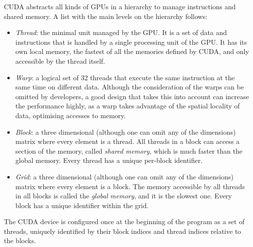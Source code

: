 \ac{CUDA} abstracts all kinds of \acp{GPU} in a hierarchy to manage instructions and shared memory. A list with the main levels on the hierarchy follows:
\begin{itemize}
	\item \emph{Thread}: the minimal unit managed by the \ac{GPU}. It is a set of data and instructions that is handled by a single processing unit of the \ac{GPU}. It has its own local memory, the fastest of all the memories defined by \ac{CUDA}, and only accessible by the thread itself.
	\item \emph{Warp}: a logical set of 32 threads that execute the same instruction at the same time on different data. Although the consideration of the warps can be omitted by developers, a good design that takes this into account can increase the performance highly, as a warp takes advantage of the spatial locality of data, optimising accesses to memory.
	\item \emph{Block}: a three dimensional (although one can omit any of the dimensions) matrix where every element is a thread. All threads in a block can access a section of the memory, called \emph{shared memory}, which is much faster than the global memory. Every thread has a unique per-block identifier.
	\item \emph{Grid}: a three dimensional (although one can omit any of the dimensions) matrix where every element is a block. The memory accessible by all threads in all blocks is called the \emph{global memory}, and it is the slowest one. Every block has a unique identifier within the grid.
\end{itemize}

The \ac{CUDA} device is configured once at the beginning of the program as a set of threads, uniquely identified by their block indices and thread indices relative to the blocks.

